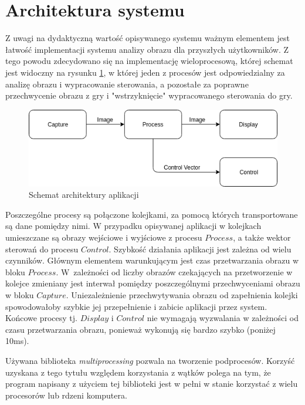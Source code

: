 \section{Architektura systemu}

Z uwagi na dydaktyczną wartość opisywanego systemu ważnym elementem jest łatwość implementacji systemu analizy obrazu dla przyszłych użytkowników. %
Z tego powodu zdecydowano się na implementację wieloprocesową, której schemat jest widoczny na rysunku \ref{fig:arch}, w której jeden z procesów jest odpowiedzialny za analizę obrazu i wypracowanie sterowania, a pozostałe za poprawne przechwycenie obrazu z gry i "wstrzyknięcie" wypracowanego sterowania do gry. %

\begin{figure}
  \centering
  \includegraphics[width=13cm]{img/architektura.png}
  \caption{Schemat architektury aplikacji}
  \label{fig:arch}
\end{figure}

Poszczególne procesy są połączone kolejkami, za pomocą których transportowane są dane pomiędzy nimi. 
W przypadku opisywanej aplikacji w kolejkach umieszczane są obrazy wejściowe i wyjściowe z procesu $Process$, a także wektor sterowań do procesu $Control$. 
Szybkość działania aplikacji jest zależna od wielu czynników. 
Głównym elementem warunkującym jest czas przetwarzania obrazu w bloku $Process$. 
W~zależności od liczby obrazów czekających na przetworzenie w kolejce zmieniany jest interwał pomiędzy poszczególnymi przechwyceniami obrazu w bloku $Capture$. 
Uniezależnienie przechwytywania obrazu od zapełnienia kolejki spowodowałoby szybkie jej przepełnienie i zabicie aplikacji przez system.  %
Końcowe procesy tj. $Display$ i $Control$ nie wymagają wyzwalania w zależności od czasu przetwarzania obrazu, ponieważ wykonują się bardzo szybko (poniżej 10ms).

Używana biblioteka \textit{multiprocessing}\cite{S2} pozwala na tworzenie podprocesów. 
Korzyść uzyskana z tego tytułu względem korzystania z wątków polega na tym, że program napisany z użyciem tej biblioteki jest w pełni w stanie korzystać z wielu procesorów lub rdzeni komputera. %

